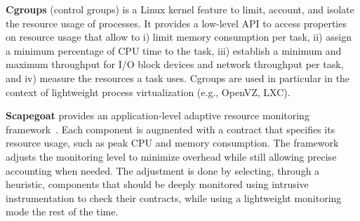 \textbf{Cgroups} (control groups) is a Linux kernel feature to limit, account, and isolate the resource usage of processes. 
It provides a low-level API to access properties on resource usage that allow to i) limit memory consumption per task, 
ii) assign a minimum percentage of CPU time to the task,
iii) establish a minimum and maximum throughput for I/O block devices and network throughput per task, and
iv) measure the resources a task uses.
Cgroups are used in particular in the context of lightweight process virtualization (e.g., OpenVZ, LXC).


\textbf{Scapegoat} provides an application-level adaptive resource monitoring framework~\cite{gonzalezherrera:hal-00983045}.
Each component is augmented with a contract that specifies its resource usage, such as peak CPU and memory consumption.
The framework adjusts the monitoring level to minimize overhead while still allowing precise accounting when needed.
The adjustment is done by selecting, through a heuristic, components that should be deeply monitored using intrusive instrumentation to check their contracts, while using a lightweight monitoring mode the rest of the time.



